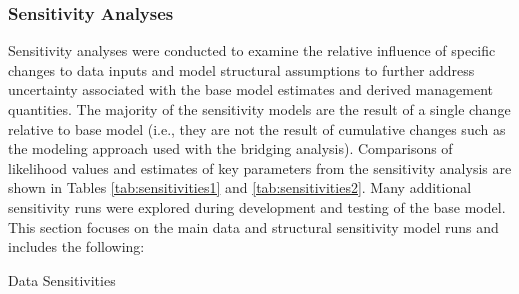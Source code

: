 \documentclass[11pt,
  english,
  a4paper,
]{article}
\begin{document}
\leavevmode\tagmcend\tagstructend\par


\hypertarget{sensitivity-analyses}{%
\subsubsection{Sensitivity Analyses}\label{sensitivity-analyses}}

\leavevmode\tagmcend\tagstructend


Sensitivity analyses were conducted to examine the relative influence of specific changes to data inputs and model structural assumptions to further address uncertainty associated with the base model estimates and derived management quantities. The majority of the sensitivity models are the result of a single change relative to base model (i.e., they are not the result of cumulative changes such as the modeling approach used with the bridging analysis). Comparisons of likelihood values and estimates of key parameters from the sensitivity analysis are shown in Tables \ref{tab:sensitivities1} and \ref{tab:sensitivities2}. Many additional sensitivity runs were explored during development and testing of the base model. This section focuses on the main data and structural sensitivity model runs and includes the following:

\leavevmode\tagmcend\tagstructend\par


Data Sensitivities

\leavevmode\tagmcend\tagstructend\par
\end{document}

